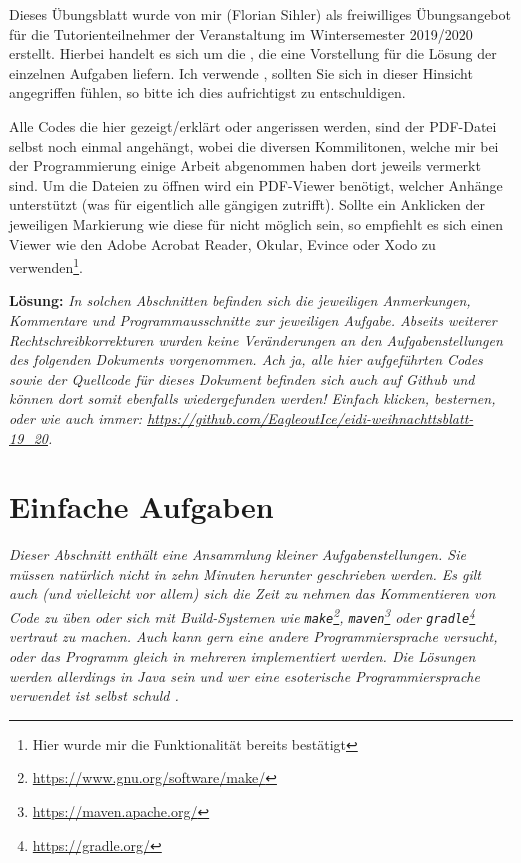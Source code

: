 \documentclass[table]{sopra-base}
\makeatletter
\let\T\texttt
\def\pc{\noexpand\rotatebox[origin=c]{270}{\noexpand\faPaperclip{}}}
\def\aJava#1{\attachDocumentText{#1}{\pc{} #1}}
\newenvironment{solution}{\null\par\noindent\textbf{\textcolor{sob@col@uulm@cs}{Lösung:}}\newline\bgroup\color{black}\slshape\ignorespaces}{\egroup}
\makeatother
\begin{document}
Dieses Übungsblatt wurde von mir (Florian Sihler) als freiwilliges Übungsangebot für die Tutorienteilnehmer der Veranstaltung  im Wintersemester 2019/2020 erstellt. Hierbei handelt es sich um die , die eine Vorstellung für die Lösung der einzelnen Aufgaben liefern. Ich verwende \say{\T{du}}, sollten Sie sich in dieser Hinsicht angegriffen fühlen, so bitte ich dies aufrichtigst zu entschuldigen.\par{}

Alle Codes die hier gezeigt/erklärt oder angerissen werden, sind der PDF-Datei selbst noch einmal
angehängt, wobei die diversen Kommilitonen, welche mir bei der Programmierung einige Arbeit abgenommen haben dort jeweils vermerkt sind. Um die Dateien zu öffnen wird ein PDF-Viewer benötigt, welcher Anhänge unterstützt (was für eigentlich alle gängigen zutrifft). Sollte ein Anklicken der jeweiligen Markierung wie diese für \aJava{Test.java} nicht möglich sein, so empfiehlt es sich einen Viewer wie den Adobe Acrobat Reader, Okular, Evince oder Xodo zu verwenden\footnote{Hier wurde mir die Funktionalität bereits bestätigt \Laughey}. 

\begin{solution}
    In solchen Abschnitten befinden sich die jeweiligen Anmerkungen, Kommentare und Programmausschnitte zur jeweiligen Aufgabe. Abseits weiterer Rechtschreibkorrekturen wurden keine Veränderungen an den Aufgabenstellungen des folgenden Dokuments vorgenommen. Ach ja, alle hier aufgeführten Codes sowie der Quellcode für dieses Dokument befinden sich auch auf Github und können dort somit ebenfalls wiedergefunden werden! Einfach klicken, besternen, oder wie auch immer: \url{https://github.com/EagleoutIce/eidi-weihnachttsblatt-19_20}.
\end{solution}

%
%
%
%

\section{Einfache Aufgaben}

\textit{Dieser Abschnitt enthält eine Ansammlung kleiner Aufgabenstellungen. Sie müssen natürlich nicht in zehn Minuten herunter geschrieben werden. Es gilt auch (und vielleicht vor allem) sich die Zeit zu nehmen das
Kommentieren von Code zu üben oder sich mit Build-Systemen wie \T{make}\footnote{\url{https://www.gnu.org/software/make/}}, \T{maven}\footnote{\url{https://maven.apache.org/}} oder \T{gradle}\footnote{\url{https://gradle.org/}} vertraut zu machen. Auch kann gern eine andere Programmiersprache versucht, oder das Programm gleich in mehreren implementiert werden. Die Lösungen werden allerdings in Java sein und wer eine esoterische Programmiersprache verwendet ist selbst schuld \Winkey.}\par{}
\end{document}
